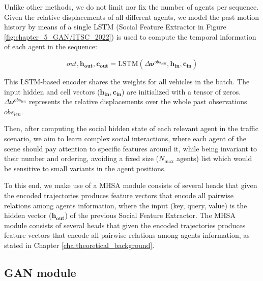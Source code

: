 Unlike other methods, we do not limit nor fix the number of agents per sequence. Given the relative displacements of all different agents, we model the past motion history by means of a single \ac{LSTM} (Social Feature Extractor in Figure \ref{fig:chapter_5_GAN/ITSC_2022}) is used to compute the temporal information of each agent in the sequence:

\begin{equation}
	out, \mathbf{h_{out}}, \mathbf{c_{out}} = \mathrm{LSTM}(\Delta \boldsymbol{\nu}^{obs_{len}}, \mathbf{h_{in}}, \mathbf{c_{in}})
\end{equation}

This \ac{LSTM}-based encoder shares the weights for all vehicles in the batch. The input hidden and cell vectors ($\mathbf{h_{in}}, \mathbf{c_{in}}$) are initialized with a tensor of zeros. $\Delta \boldsymbol{\nu}^{obs_{len}}$ represents the relative displacements over the whole past observations $obs_{len}$.

Then, after computing the social hidden state of each relevant agent in the traffic scenario, we aim to learn complex social interactions, where each agent of the scene should pay attention to specific features around it, while being invariant to their number and ordering, avoiding a fixed size ($N_{\text{max}}$ agents) list which would be sensitive to small variants in the agent positions.

To this end, we make use of a \ac{MHSA} module consists of several heads that given the encoded trajectories produces feature vectors that encode all pairwise relations among agents information, where the input (key, query, value) is the hidden vector ($\mathbf{h_{out}}$) of the previous Social Feature Extractor. The \ac{MHSA} module consists of several heads that given the encoded trajectories produces feature vectors that encode all pairwise relations among agents information, as stated in Chapter \ref{cha:theoretical_background}. %

\subsection{GAN module}
\label{subsec:5_gan_module}

